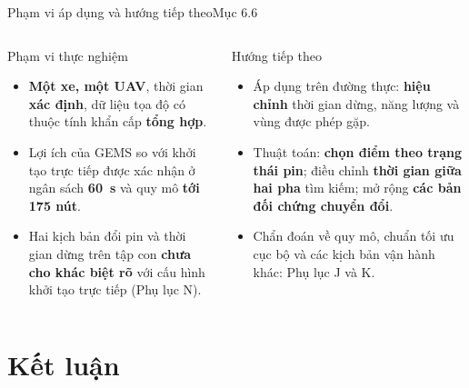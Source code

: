 \documentclass[aspectratio=169,10pt,t,xcolor={table}]{beamer}
\newcommand{\src}[1]{\hfill{\normalfont\footnotesize\color{white!62!navy}#1}}  %
\begin{document}
\begin{frame}{Phạm vi áp dụng và hướng tiếp theo\src{Mục 6.6}}
\begin{columns}[T,onlytextwidth]
\begin{alertblock}{Phạm vi thực nghiệm}
\footnotesize
\begin{itemize}
\item \textbf{Một xe, một UAV}, thời gian \textbf{xác định}, dữ liệu tọa độ có thuộc tính khẩn cấp \textbf{tổng hợp}.
\item Lợi ích của GEMS so với khởi tạo trực tiếp được xác nhận ở ngân sách \textbf{60~s} và quy mô \textbf{tới 175 nút}.
\item Hai kịch bản đổi pin và thời gian dừng trên tập con \textbf{chưa cho khác biệt rõ} với cấu hình khởi tạo trực tiếp (Phụ lục N).
\end{itemize}
\end{alertblock}
\begin{block}{Hướng tiếp theo}
\footnotesize
\begin{itemize}
\item Áp dụng trên đường thực: \textbf{hiệu chỉnh} thời gian dừng, năng lượng và vùng được phép gặp.
\item Thuật toán: \textbf{chọn điểm theo trạng thái pin}; điều chỉnh \textbf{thời gian giữa hai pha} tìm kiếm; mở rộng \textbf{các bản đối chứng chuyển đổi}.
\item Chẩn đoán về quy mô, chuẩn tối ưu cục bộ và các kịch bản vận hành khác: Phụ lục J và K.
\end{itemize}
\end{block}
\end{columns}
\end{frame}
\section{Kết luận}
\end{document}
